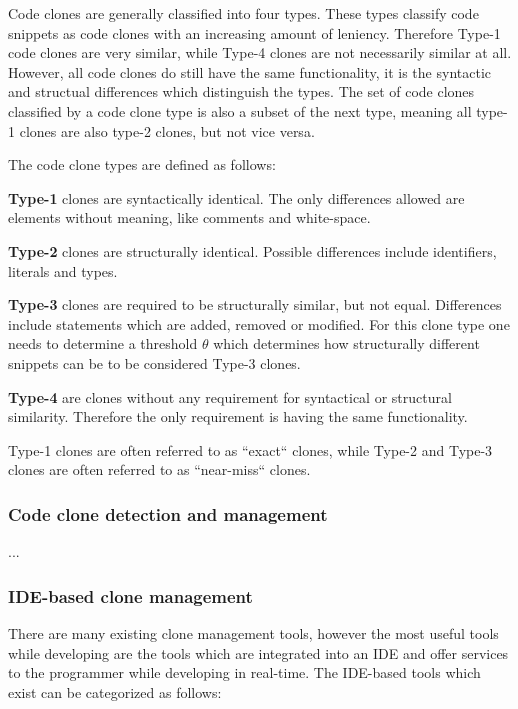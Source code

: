 \documentclass[12pt]{article}
\begin{document}
Code clones are generally classified into four types.\cite{Inoue_introduction_to_cc} These
types classify code snippets as code clones with an increasing amount of leniency.
Therefore Type-1 code clones are very similar, while Type-4 clones are not necessarily
similar at all. However, all code clones do still have the same functionality, it is the
syntactic and structual differences which distinguish the types. The set of code clones
classified by a code clone type is also a subset of the next type, meaning all type-1
clones are also type-2 clones, but not vice versa.

The code clone types are defined as follows:

\textbf{Type-1} clones are syntactically identical. The only differences allowed are elements
without meaning, like comments and white-space. 

\textbf{Type-2} clones are structurally identical. Possible differences include
identifiers, literals and types. 

\textbf{Type-3} clones are required to be structurally similar, but not equal. Differences
include statements which are added, removed or modified. For this clone type one needs to
determine a threshold $\theta$ which determines how structurally different snippets can be
to be considered Type-3 clones.\cite{Inoue_introduction_to_cc}

\textbf{Type-4} are clones without any requirement for syntactical or structural similarity. Therefore
the only requirement is having the same functionality.

Type-1 clones are often referred to as ``exact`` clones, while Type-2 and Type-3 clones are
often referred to as ``near-miss`` clones.\cite[1]{Zibran_real_time_search}

\subsubsection{Code clone detection and management}

...

\subsubsection{IDE-based clone management}

There are many existing clone management tools, however the most useful tools while
developing are the tools which are integrated into an IDE and offer services to the
programmer while developing in real-time. The IDE-based tools which
exist can be categorized as follows\cite[8]{Udding_Towards_Convenient_Management}:
\end{document}
